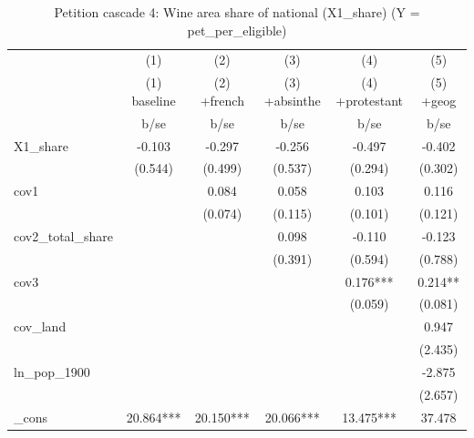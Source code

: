 \begin{table}[htbp]\centering
\def\sym#1{\ifmmode^{#1}\else\(^{#1}\)\fi}
\caption{Petition cascade 4: Wine area share of national (X1\_share)  (Y = pet\_per\_eligible) \label{tab:petcasc4}}
\begin{tabular}{l*{5}{c}}
\toprule
            &\multicolumn{1}{c}{(1)}&\multicolumn{1}{c}{(2)}&\multicolumn{1}{c}{(3)}&\multicolumn{1}{c}{(4)}&\multicolumn{1}{c}{(5)}\\
            &\multicolumn{1}{c}{(1) baseline}&\multicolumn{1}{c}{(2) +french}&\multicolumn{1}{c}{(3) +absinthe}&\multicolumn{1}{c}{(4) +protestant}&\multicolumn{1}{c}{(5) +geog}\\
            &        b/se   &        b/se   &        b/se   &        b/se   &        b/se   \\
\midrule
X1\_share    &      -0.103   &      -0.297   &      -0.256   &      -0.497   &      -0.402   \\
            &     (0.544)   &     (0.499)   &     (0.537)   &     (0.294)   &     (0.302)   \\
cov1        &               &       0.084   &       0.058   &       0.103   &       0.116   \\
            &               &     (0.074)   &     (0.115)   &     (0.101)   &     (0.121)   \\
cov2\_total\_share&               &               &       0.098   &      -0.110   &      -0.123   \\
            &               &               &     (0.391)   &     (0.594)   &     (0.788)   \\
cov3        &               &               &               &       0.176***&       0.214** \\
            &               &               &               &     (0.059)   &     (0.081)   \\
cov\_land    &               &               &               &               &       0.947   \\
            &               &               &               &               &     (2.435)   \\
ln\_pop\_1900 &               &               &               &               &      -2.875   \\
            &               &               &               &               &     (2.657)   \\
\_cons      &      20.864***&      20.150***&      20.066***&      13.475***&      37.478   \\

\end{tabular}
\end{table}
